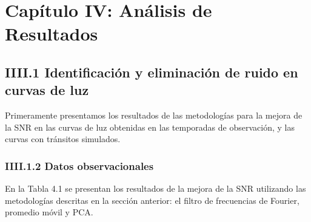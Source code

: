 \chapter*{\textbf{Capítulo IV: Análisis de Resultados}}

\section*{IIII.1 Identificación y eliminación de ruido en curvas de luz}

Primeramente presentamos los resultados de las metodologías para la mejora de la SNR en las curvas de luz obtenidas en las temporadas de observación, y las curvas con tránsitos simulados.

\subsection*{IIII.1.2 Datos observacionales}

En la Tabla 4.1 se presentan los resultados de la mejora de la SNR utilizando las metodologías descritas en la sección anterior: el filtro de frecuencias de Fourier, promedio móvil y PCA.

